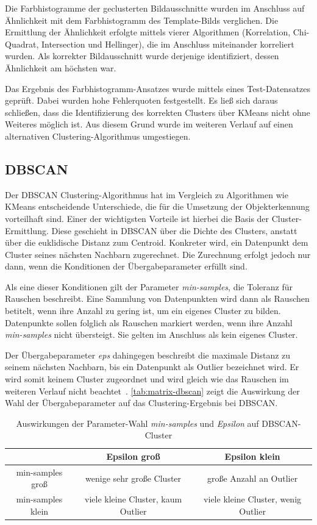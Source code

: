 \documentclass[
    type=Prakikumsbericht,
    status=draft, %
    language=german, %
    bibengine=bibtex,
]{unibwm-inf-thesis}
\begin{document}
    Die Farbhistogramme der geclusterten Bildausschnitte wurden im Anschluss auf Ähnlichkeit mit dem Farbhistogramm des Template-Bilds verglichen.
    Die Ermittlung der Ähnlichkeit erfolgte mittels vierer Algorithmen (Korrelation, Chi-Quadrat, Intersection und Hellinger), die im Anschluss miteinander korreliert wurden.
    Als korrekter Bildausschnitt wurde derjenige identifiziert, dessen Ähnlichkeit am höchsten war.

    Das Ergebnis des Farbhistogramm-Ansatzes wurde mittels eines Test-Datensatzes geprüft.
    Dabei wurden hohe Fehlerquoten festgestellt.
    Es ließ sich daraus schließen, dass die Identifizierung des korrekten Clusters über KMeans nicht ohne Weiteres möglich ist.
    Aus diesem Grund wurde im weiteren Verlauf auf einen alternativen Clustering-Algorithmus umgestiegen.

    \subsection{DBSCAN}\label{subsec:dbscan}
    Der \ac{DBSCAN} Clustering-Algorithmus hat im Vergleich zu Algorithmen wie KMeans entscheidende Unterschiede, die für die Umsetzung der Objekterkennung vorteilhaft sind.
    Einer der wichtigsten Vorteile ist hierbei die Basis der Cluster-Ermittlung.
    Diese geschieht in \ac{DBSCAN} über die Dichte des Clusters, anstatt über die euklidische Distanz zum Centroid.
    Konkreter wird, ein Datenpunkt dem Cluster seines nächsten Nachbarn zugerechnet.
    Die Zurechnung erfolgt jedoch nur dann, wenn die Konditionen der Übergabeparameter erfüllt sind.

    Als eine dieser Konditionen gilt der Parameter \textit{min-samples}, die Toleranz für Rauschen beschreibt.
    Eine Sammlung von Datenpunkten wird dann als Rauschen betitelt, wenn ihre Anzahl zu gering ist, um ein eigenes Cluster zu bilden.
    Datenpunkte sollen folglich als Rauschen markiert werden, wenn ihre Anzahl \textit{min-samples} nicht übersteigt.
    Sie gelten im Anschluss als kein eigenes Cluster.

    Der Übergabeparameter \textit{eps} dahingegen beschreibt die maximale Distanz zu seinem nächsten Nachbarn, bis ein Datenpunkt als Outlier bezeichnet wird.
    Er wird somit keinem Cluster zugeordnet und wird gleich wie das Rauschen im weiteren Verlauf nicht beachtet~\citep{Bedre2022}.
    \autoref{tab:matrix-dbscan} zeigt die Auswirkung der Wahl der Übergabeparameter auf das Clustering-Ergebnis bei \ac{DBSCAN}.
    \begin{table}[h]
        \centering
        \begin{tabular}{c | c | c}
            & Epsilon groß & Epsilon klein \\ \hline
            min-samples groß & wenige sehr große Cluster & große Anzahl an Outlier\\ \hline
            min-samples klein & viele kleine Cluster, kaum Outlier & viele kleine Cluster, wenig Outlier
        \end{tabular}
        \caption{Auswirkungen der Parameter-Wahl \textit{min-samples} und \textit{Epsilon} auf \ac{DBSCAN}-Cluster}
        \label{tab:matrix-dbscan}
    \end{table}
\end{document}

